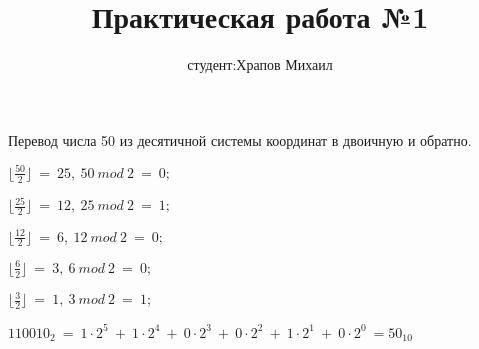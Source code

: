 \documentclass[a4paper,11pt]{article}
\title{Практическая работа №1}
\author{студент:Храпов Михаил}
\begin{document}
Перевод числа 50 из десятичной системы координат в двоичную и обратно.

$\lfloor\frac{50}{2}\rfloor\ =\ 25,\ 50\ mod\ 2\ =\ 0;$

$\lfloor\frac{25}{2}\rfloor\ =\ 12,\ 25\ mod\ 2\ =\ 1;$

$\lfloor\frac{12}{2}\rfloor\ =\ 6,\ 12\ mod\ 2\ =\ 0;$

$\lfloor\frac{6}{2}\rfloor\ =\ 3,\ 6\ mod\ 2\ =\ 0;$

$\lfloor\frac{3}{2}\rfloor\ =\ 1,\ 3\ mod\ 2\ =\ 1;$
\newline

$110010_2\ =\ 1\cdot 2^5\ +\ 1\cdot 2^4\ +\ 0\cdot 2^3\ +\ 0\cdot 2^2\ +\ 1\cdot 2^1\ +\ 0\cdot 2^0\ =50_{10}$
\end{document}
